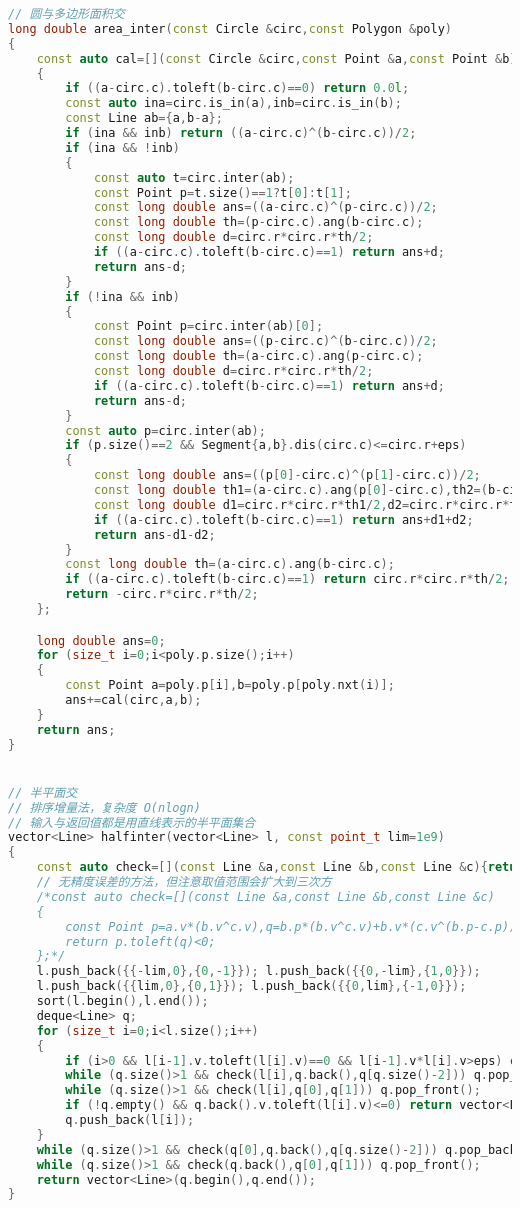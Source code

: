 \documentclass[a4paper]{book}
\begin{document}
\begin{lstlisting}[language=c++]
// 圆与多边形面积交
long double area_inter(const Circle &circ,const Polygon &poly)
{
    const auto cal=[](const Circle &circ,const Point &a,const Point &b)
    {
        if ((a-circ.c).toleft(b-circ.c)==0) return 0.0l;
        const auto ina=circ.is_in(a),inb=circ.is_in(b);
        const Line ab={a,b-a};
        if (ina && inb) return ((a-circ.c)^(b-circ.c))/2;
        if (ina && !inb)
        {
            const auto t=circ.inter(ab);
            const Point p=t.size()==1?t[0]:t[1];
            const long double ans=((a-circ.c)^(p-circ.c))/2;
            const long double th=(p-circ.c).ang(b-circ.c);
            const long double d=circ.r*circ.r*th/2;
            if ((a-circ.c).toleft(b-circ.c)==1) return ans+d;
            return ans-d;
        }
        if (!ina && inb)
        {
            const Point p=circ.inter(ab)[0];
            const long double ans=((p-circ.c)^(b-circ.c))/2;
            const long double th=(a-circ.c).ang(p-circ.c);
            const long double d=circ.r*circ.r*th/2;
            if ((a-circ.c).toleft(b-circ.c)==1) return ans+d;
            return ans-d;
        }
        const auto p=circ.inter(ab);
        if (p.size()==2 && Segment{a,b}.dis(circ.c)<=circ.r+eps)
        {
            const long double ans=((p[0]-circ.c)^(p[1]-circ.c))/2;
            const long double th1=(a-circ.c).ang(p[0]-circ.c),th2=(b-circ.c).ang(p[1]-circ.c);
            const long double d1=circ.r*circ.r*th1/2,d2=circ.r*circ.r*th2/2;
            if ((a-circ.c).toleft(b-circ.c)==1) return ans+d1+d2;
            return ans-d1-d2;
        }
        const long double th=(a-circ.c).ang(b-circ.c);
        if ((a-circ.c).toleft(b-circ.c)==1) return circ.r*circ.r*th/2;
        return -circ.r*circ.r*th/2;
    };

    long double ans=0;
    for (size_t i=0;i<poly.p.size();i++)
    {
        const Point a=poly.p[i],b=poly.p[poly.nxt(i)];
        ans+=cal(circ,a,b);
    }
    return ans;
}


// 半平面交
// 排序增量法，复杂度 O(nlogn)
// 输入与返回值都是用直线表示的半平面集合
vector<Line> halfinter(vector<Line> l, const point_t lim=1e9)
{
    const auto check=[](const Line &a,const Line &b,const Line &c){return a.toleft(b.inter(c))<0;};
    // 无精度误差的方法，但注意取值范围会扩大到三次方
    /*const auto check=[](const Line &a,const Line &b,const Line &c)
    {
        const Point p=a.v*(b.v^c.v),q=b.p*(b.v^c.v)+b.v*(c.v^(b.p-c.p))-a.p*(b.v^c.v);
        return p.toleft(q)<0;
    };*/
    l.push_back({{-lim,0},{0,-1}}); l.push_back({{0,-lim},{1,0}});
    l.push_back({{lim,0},{0,1}}); l.push_back({{0,lim},{-1,0}});
    sort(l.begin(),l.end());
    deque<Line> q;
    for (size_t i=0;i<l.size();i++)
    {
        if (i>0 && l[i-1].v.toleft(l[i].v)==0 && l[i-1].v*l[i].v>eps) continue;
        while (q.size()>1 && check(l[i],q.back(),q[q.size()-2])) q.pop_back();
        while (q.size()>1 && check(l[i],q[0],q[1])) q.pop_front();
        if (!q.empty() && q.back().v.toleft(l[i].v)<=0) return vector<Line>();
        q.push_back(l[i]);
    }
    while (q.size()>1 && check(q[0],q.back(),q[q.size()-2])) q.pop_back();
    while (q.size()>1 && check(q.back(),q[0],q[1])) q.pop_front();
    return vector<Line>(q.begin(),q.end());
}


\end{lstlisting}
\end{document}
